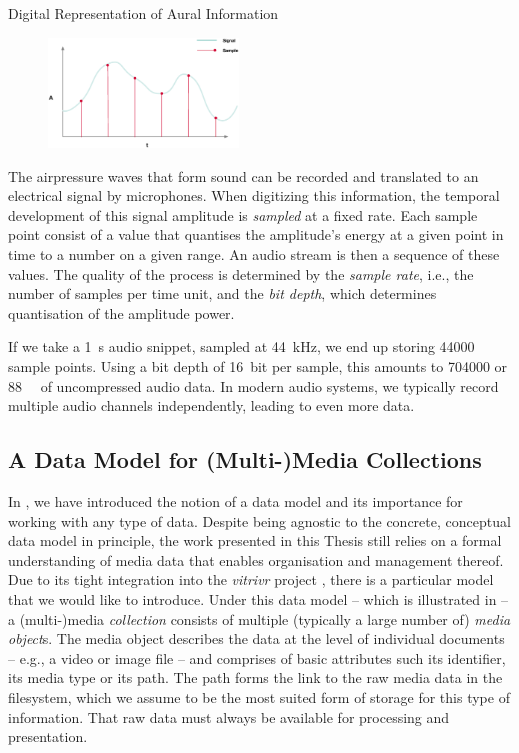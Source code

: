 \begin{example}[label=example:representation_audio_information]{Digital Representation of Aural Information}{}
    \begin{figure}
        \includegraphics[width=0.45\textwidth]{figures/example-audio-signal.eps}
    \end{figure}
    The airpressure waves that form sound can be recorded and translated to an electrical signal by microphones. When digitizing this information, the temporal development of this signal amplitude is \emph{sampled} at a fixed rate. Each sample point consist of a value that quantises the amplitude's energy at a given point in time to a number on a given range. An audio stream is then a sequence of these values. The quality of the process is determined by the \emph{sample rate}, i.e., the number of samples per time unit, and the \emph{bit depth}, which determines quantisation of the amplitude power.

    If we take a \SI{1}{\second} audio snippet, sampled at \SI{44}{\kilo\hertz}, we end up storing \num{44000} sample points. Using a bit depth of \SI{16}{bit} per sample, this amounts to \SI{704000}{\bit} or \SI{88}{\kilo\byte} of uncompressed audio data. In modern audio systems, we typically record multiple audio channels independently, leading to even more data.
\end{example}

\subsection{A Data Model for (Multi-)Media Collections}
\label{section:media_data_model}
In , we have introduced the notion of a data model and its importance for working with any type of data. Despite being agnostic to the concrete, conceptual data model in principle, the work presented in this Thesis still relies on a formal understanding of media data that enables organisation and management thereof. Due to its tight integration into the \emph{vitrivr} project \cite{Rossetto:2016Vitrivr,Gasser:2019Multimodal,Heller:2020Multi}, there is a particular model that we would like to introduce. Under this data model -- which is illustrated in  -- a (multi-)media \emph{collection} consists of multiple (typically a large number of) \emph{media object}s. The media object describes the data at the level of individual documents -- e.g., a video or image file -- and comprises of basic attributes such its identifier, its media type or its path. The path forms the link to the raw media data in the filesystem, which we assume to be the most suited form of storage for this type of information. That raw data must always be available for processing and presentation.

